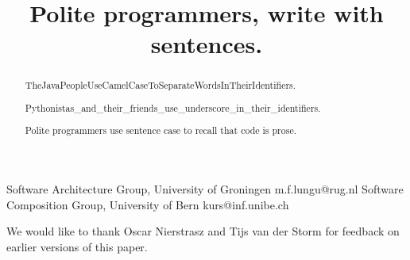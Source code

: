 \documentclass[preprint]{sigplanconf}
\begin{document}
\setlength{\pdfpageheight}{\paperheight}
\setlength{\pdfpagewidth}{\paperwidth}




\title{Polite programmers, write with sentences.}

           {Software Architecture Group,
           University of Groningen}
           {m.f.lungu@rug.nl}
           {Software Composition Group,
           University of Bern}
           {kurs@inf.unibe.ch}

\maketitle

\begin{abstract}

\noindent
TheJavaPeopleUseCamelCaseToSeparateWordsInTheirIdentifiers. 

\noindent
Pythonistas\_and\_their\_friends\_use\_underscore\_in\_their\_identifiers. 

\noindent
Polite programmers use sentence case to recall that code is prose.
\end{abstract}
\vspace {1cm}







\acks

We would like to thank Oscar Nierstrasz and Tijs van der Storm for feedback on earlier versions of this paper.










\end{document}
